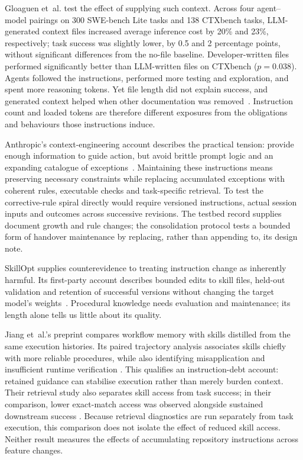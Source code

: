 Gloaguen et~al. test the effect of supplying such context. Across four
agent--model pairings on 300 SWE-bench Lite tasks and 138 CTXbench tasks,
LLM-generated context files increased average inference cost by 20\% and
23\%, respectively; task success was slightly lower, by 0.5 and 2 percentage
points, without significant differences from the no-file baseline.
Developer-written files performed significantly better than LLM-written
files on CTXbench ($p=0.038$). Agents followed the instructions, performed more testing
and exploration, and spent more reasoning tokens. Yet file length did not
explain success, and generated context helped when other documentation was
removed~\cite[Secs.~4.2--4.4, App.~B]{gloaguen2026agentsmd}.
Instruction count and loaded tokens are therefore different exposures from
the obligations and behaviours those instructions induce.

Anthropic's context-engineering account describes the practical tension:
provide enough information to guide action, but avoid brittle prompt logic
and an expanding catalogue of exceptions~\cite{rajasekaran2025context}.
Maintaining these instructions means preserving necessary constraints while
replacing accumulated exceptions with coherent rules, executable checks and
task-specific retrieval. To test the corrective-rule
spiral directly would require versioned instructions, actual session inputs
and outcomes across successive revisions. The testbed record supplies document
growth and rule changes; the consolidation protocol tests a bounded form of
handover maintenance by replacing, rather than appending to, its design note.

SkillOpt supplies counterevidence to treating instruction change as
inherently harmful. Its first-party account describes bounded edits to
skill files, held-out validation and retention of successful versions
without changing the target model's weights~\cite{microsoft2026skillopt}.
Procedural knowledge needs evaluation and maintenance; its length alone
tells us little about its quality.

Jiang et~al.'s preprint compares workflow memory with skills distilled from
the same execution histories. Its paired trajectory analysis associates
skills chiefly with more reliable procedures, while also identifying
misapplication and insufficient runtime verification
\cite[Secs.~3.3, 5.1--5.3]{jiang2026skills}.
This qualifies an instruction-debt account: retained guidance can stabilise
execution rather than merely burden context. Their retrieval study also
separates skill access from task success; in their comparison, lower
exact-match access was observed alongside sustained downstream success
\cite[Sec.~5.5]{jiang2026skills}. Because retrieval diagnostics are run
separately from task execution, this comparison does not isolate the effect
of reduced skill access. Neither result measures the effects of
accumulating repository instructions across feature changes.

